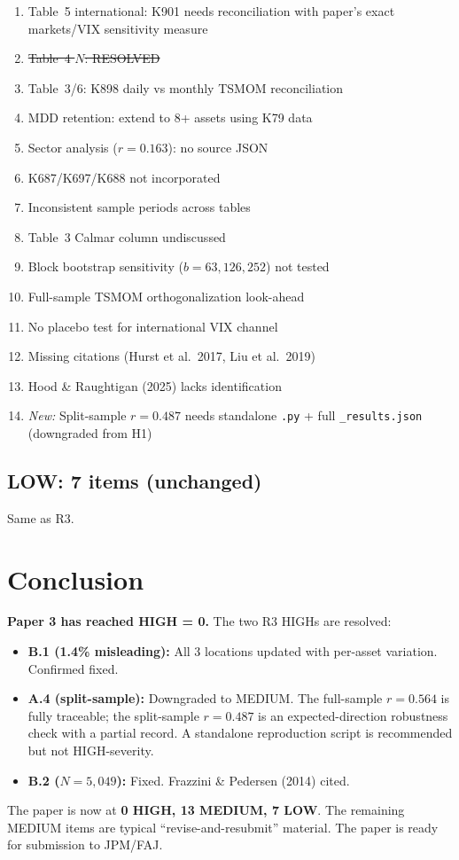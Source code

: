 \documentclass[12pt,a4paper]{article}
\begin{document}
\begin{enumerate}[label=\textcolor{medsev}{\textbf{M\arabic*}}]
\item Table~5 international: K901 needs reconciliation with paper's exact markets/VIX sensitivity measure
\item \sout{Table~4 $N$: RESOLVED}
\item Table~3/6: K898 daily vs monthly TSMOM reconciliation
\item MDD retention: extend to 8+ assets using K79 data
\item Sector analysis ($r = 0.163$): no source JSON
\item K687/K697/K688 not incorporated
\item Inconsistent sample periods across tables
\item Table~3 Calmar column undiscussed
\item Block bootstrap sensitivity ($b = 63, 126, 252$) not tested
\item Full-sample TSMOM orthogonalization look-ahead
\item No placebo test for international VIX channel
\item Missing citations (Hurst et al.\ 2017, Liu et al.\ 2019)
\item Hood \& Raughtigan (2025) lacks identification
\item[\textcolor{medsev}{\textbf{M14}}] \textit{New:} Split-sample $r = 0.487$ needs standalone \texttt{.py} + full \texttt{\_results.json} (downgraded from H1)
\end{enumerate}

\subsection*{\textcolor{lowsev}{LOW: 7 items (unchanged)}}

Same as R3.


\section{Conclusion}

\textbf{Paper 3 has reached HIGH = 0.} The two R3 HIGHs are resolved:

\begin{itemize}[nosep]
\item \textbf{B.1 (1.4\% misleading):} All 3 locations updated with per-asset variation. Confirmed fixed.
\item \textbf{A.4 (split-sample):} Downgraded to MEDIUM. The full-sample $r = 0.564$ is fully traceable; the split-sample $r = 0.487$ is an expected-direction robustness check with a partial record. A standalone reproduction script is recommended but not HIGH-severity.
\item \textbf{B.2 ($N = 5{,}049$):} Fixed. Frazzini \& Pedersen (2014) cited.
\end{itemize}

The paper is now at \textbf{0 HIGH, 13 MEDIUM, 7 LOW}. The remaining MEDIUM items are typical ``revise-and-resubmit'' material. The paper is ready for submission to JPM/FAJ.
\end{document}
